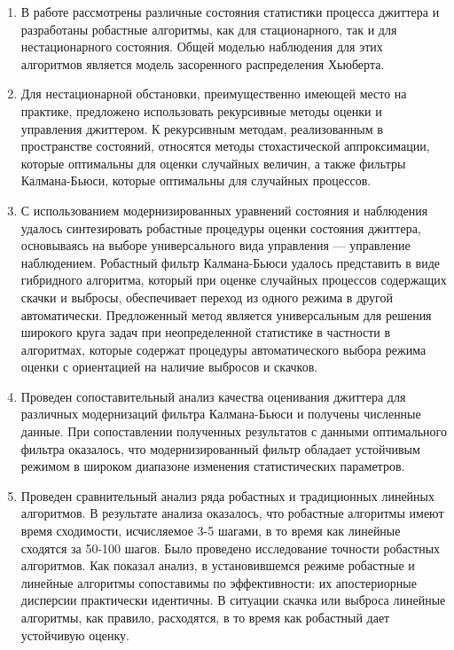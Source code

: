 \begin{enumerate}
 \item
 В работе рассмотрены различные состояния статистики процесса джиттера и разработаны робастные алгоритмы, как для стационарного, так и для нестационарного состояния.
 Общей моделью наблюдения для этих алгоритмов является модель засоренного распределения Хьюберта.
 
 \item Для нестационарной обстановки, преимущественно имеющей место на практике, предложено использовать рекурсивные методы оценки и управления джиттером.
 К рекурсивным методам, реализованным в пространстве состояний, относятся методы стохастической аппроксимации, которые оптимальны для оценки случайных величин, 
 а также фильтры Калмана-Бьюси, которые оптимальны для случайных процессов.
 
 \item С использованием модернизированных уравнений состояния и наблюдения удалось синтезировать робастные процедуры оценки состояния джиттера, 
 основываясь на выборе универсального вида управления --- управление наблюдением.
 Робастный фильтр Калмана-Бьюси удалось представить в виде гибридного алгоритма, который при оценке случайных процессов содержащих скачки и выбросы, 
 обеспечивает переход из одного режима в другой автоматически.
 Предложенный метод является универсальным для решения широкого круга задач при неопределенной статистике в частности в алгоритмах, 
 которые содержат процедуры автоматического выбора режима оценки с ориентацией на наличие выбросов и скачков.
 
 \item Проведен сопоставительный анализ качества оценивания джиттера для различных модернизаций фильтра Калмана-Бьюси и получены численные данные.
 При сопоставлении полученных результатов с данными оптимального фильтра оказалось, что модернизированный фильтр обладает устойчивым режимом в широком диапазоне изменения статистических параметров.
 

 
 

 
 
 \item Проведен сравнительный анализ ряда робастных и традиционных линейных алгоритмов. 
 В результате анализа оказалось, что робастные алгоритмы имеют время сходимости, исчисляемое 3-5 шагами, в то время как линейные сходятся за 50-100 шагов.
 Было проведено исследование точности робастных алгоритмов.
 Как показал анализ, в установившемся режиме робастные и линейные алгоритмы сопоставимы по эффективности: их апостериорные дисперсии практически идентичны.
 В ситуации скачка или выброса линейные алгоритмы, как правило, расходятся, в то время как робастный дает устойчивую оценку.
 

\end{enumerate}
